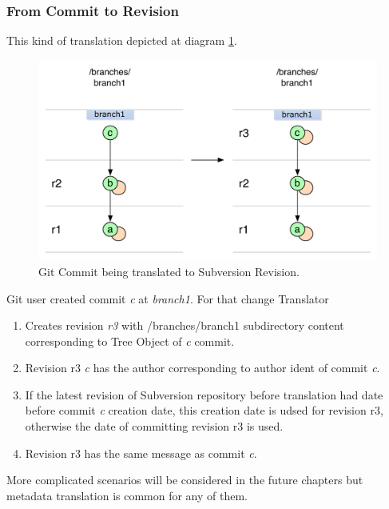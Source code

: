 \subsubsection{From Commit to Revision}

This kind of translation depicted at diagram \ref{single_change_git_to_svn}.

\begin{figure}[!h]
\centering
\includegraphics[width=\linewidth]{img/diagrams/single_change_git_to_svn.pdf}
\caption{Git Commit being translated to Subversion Revision.}
\label{single_change_git_to_svn}
\end{figure}

Git user created commit \emph{c} at \emph{branch1}. For that change Translator
\begin{enumerate}
	\item Creates revision \emph{r3} with /branches/branch1 subdirectory content corresponding to Tree Object of \emph{c} commit.
	\item Revision r3 \emph{c} has the author corresponding to author ident of commit \emph{c}.
	\item If the latest revision of Subversion repository before translation had date before commit \emph{c} creation date, this creation date is udsed for revision r3, otherwise the date of committing revision r3 is used.
	\item Revision r3 has the same message as commit \emph{c}.
\end{enumerate}

More complicated scenarios will be considered in the future chapters but metadata translation is common for any of them.